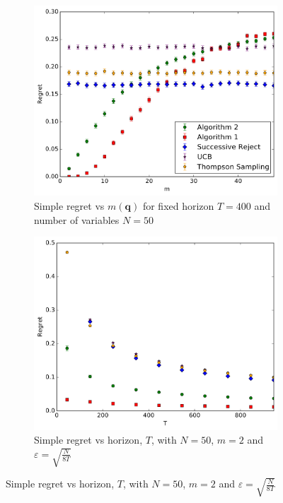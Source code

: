 \documentclass[11pt,a4paper,oneside]{book}
\let\epsilon\varepsilon
\begin{document}
\begin{figure}[h]
    \begin{subfigure}[t]{0.3\textwidth}
		\centering    
    		\includegraphics[width=\textwidth]{experiment1_20161020_1247.pdf}
    		\caption{Simple regret vs $m(\boldsymbol{q})$ for fixed horizon $T=400$ and number of variables $N = 50$}
        \label{fig:simple_vs_m}
    \end{subfigure}\hfill
    \begin{subfigure}[t]{0.3\textwidth}
    		\centering
        \includegraphics[width=\textwidth]{experiment2_20161020_1249.pdf}
    		\caption{Simple regret vs horizon, $T$, with $N = 50$, $m=2$ and $\epsilon = \sqrt{\frac{N}{8T}}$}

\end{subfigure}
\end{figure}
\end{document}
